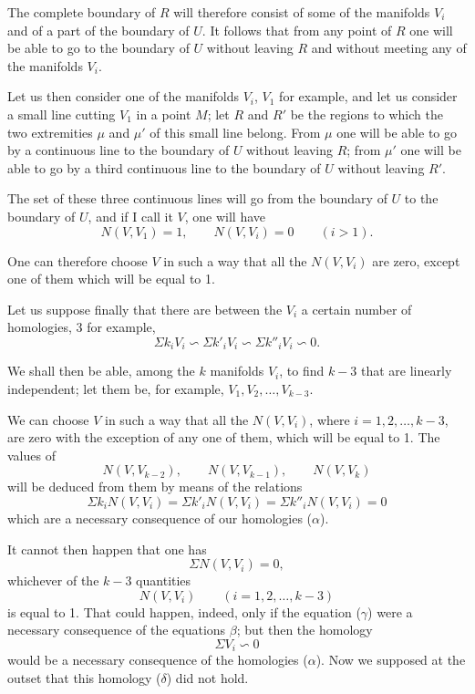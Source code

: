 \documentclass{article}
\begin{document}
The complete boundary of $R$ will therefore consist of some of the
manifolds $V_{i}$ and of a part of the boundary of $U$. It follows that from any point of $R$ one will be able to go to the boundary of $U$ without leaving $R$ and without meeting any of the manifolds $V_{i}$.

Let us then consider one of the manifolds $V_{i}$, $V_{1}$ for example, and let us consider a small line cutting $V_{1}$ in a point $M$; let $R$ and $R'$ be the regions to which the two extremities $\mu$ and $\mu'$ of this small line belong. From $\mu$ one will be able to go by a continuous line to the boundary of $U$ without leaving $R$; from $\mu'$ one will be able to go by a third continuous line to the boundary of $U$ without leaving $R'$.

The set of these three continuous lines will go from the boundary of $U$ to the boundary of $U$, and if I call it $V$, one will have
\[
N(V, V_{1}) = 1, \qquad N(V, V_{i}) = 0 \qquad (i > 1).
\]

One can therefore choose $V$ in such a way that all the $N(V, V_{i})$ are zero, except one of them which will be equal to 1.

Let us suppose finally that there are between the $V_{i}$ a certain number of homologies, 3 for example,
\[
\Sigma k_{i}V_{i} \backsim \Sigma k'_{i}V_{i} \backsim \Sigma k''_{i}V_{i} \backsim 0. \tag{$\alpha$}
\]

We shall then be able, among the $k$ manifolds $V_{i}$, to find $k-3$ that are linearly independent; let them be, for example, $V_{1}, V_{2}, \ldots, V_{k-3}$.

We can choose $V$ in such a way that all the $N(V, V_{i})$, where $i = 1, 2, \ldots, k-3$, are zero with the exception of any one of them, which will be equal to 1. The values of
\[
N(V, V_{k-2}), \qquad N(V, V_{k-1}), \qquad N(V, V_{k})
\]
will be deduced from them by means of the relations
\[
\Sigma k_{i}N(V, V_{i}) = \Sigma k'_{i}N(V, V_{i}) = \Sigma k''_{i}N(V, V_{i}) = 0 \tag{$\beta$}
\]
which are a necessary consequence of our homologies ($\alpha$).

It cannot then happen that one has
\[
\Sigma N(V, V_{i}) = 0, \tag{$\gamma$}
\]
whichever of the $k-3$ quantities
\[
N(V, V_{i}) \qquad (i = 1, 2, \ldots, k-3)
\]
is equal to 1. That could happen, indeed, only if the equation ($\gamma$) were a necessary consequence of the equations $\beta$; but then the homology
\[
\Sigma V_{i} \backsim 0 \tag{$\delta$}
\]
would be a necessary consequence of the homologies ($\alpha$). Now we supposed at the outset that this homology ($\delta$) did not hold.
\end{document}
